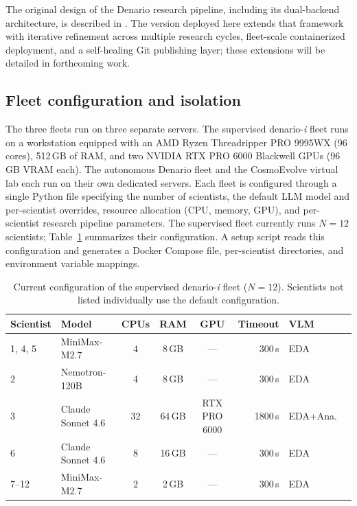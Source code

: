 \documentclass[11pt]{article}
\begin{document}
The original design of the Denario research pipeline, including its dual-backend architecture, is described in \citet{bolliet2025denario}. The version deployed here extends that framework with iterative refinement across multiple research cycles, fleet-scale containerized deployment, and a self-healing Git publishing layer; these extensions will be detailed in forthcoming work.

\subsection{Fleet configuration and isolation}

The three fleets run on three separate servers. The supervised denario-\textit{i} fleet runs on a workstation equipped with an AMD Ryzen Threadripper PRO 9995WX (96 cores), 512\,GB of RAM, and two NVIDIA RTX PRO 6000 Blackwell GPUs (96\,GB VRAM each). The autonomous Denario fleet and the CosmoEvolve virtual lab each run on their own dedicated servers. Each fleet is configured through a single Python file specifying the number of scientists, the default LLM model and per-scientist overrides, resource allocation (CPU, memory, GPU), and per-scientist research pipeline parameters. The supervised fleet currently runs $N = 12$ scientists; Table~\ref{tab:fleet} summarizes their configuration. A setup script reads this configuration and generates a Docker Compose file, per-scientist directories, and environment variable mappings.

\begin{table}[t]
\centering
\caption{Current configuration of the supervised denario-\textit{i} fleet ($N = 12$). Scientists not listed individually use the default configuration.}
\label{tab:fleet}
{\small
\begin{tabular}{@{}llcccrll@{}}
\toprule
Scientist & Model & CPUs & RAM & GPU & Timeout & VLM \\
\midrule
1, 4, 5 & MiniMax-M2.7 & 4 & 8\,GB & --- & 300\,s & EDA \\
2 & Nemotron-120B & 4 & 8\,GB & --- & 300\,s & EDA \\
3 & Claude Sonnet 4.6 & 32 & 64\,GB & RTX PRO 6000 & 1800\,s & EDA+Ana. \\
6 & Claude Sonnet 4.6 & 8 & 16\,GB & --- & 300\,s & EDA \\
7--12 & MiniMax-M2.7 & 2 & 2\,GB & --- & 300\,s & EDA \\
\bottomrule
\end{tabular}
}
\end{table}
\end{document}
